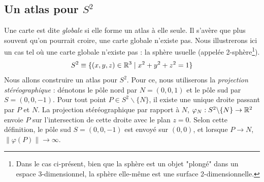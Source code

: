\subsection{Un atlas pour $S^2$}
Une carte est dite \emph{globale} si elle forme un atlas à elle seule. Il s'avère que plus souvent qu'on pourrait croire, une carte globale n'existe pas. Nous illustrerons ici un cas tel où une carte globale n'existe pas : la sphère usuelle (appelée 2-sphère\footnote{Dans le cas ci-présent, bien que la sphère est un objet "plongé" dans un espace 3-dimensionnel, la sphère elle-même est une surface 2-dimensionnelle.}).
\begin{equation}
    S^2 \equiv \{ (x,y,z) \in \mathbb{R}^3 \mid x^2+y^2+z^2 = 1\}
\end{equation}
Nous allons construire un atlas pour $S^2$. Pour ce, nous utiliserons la \emph{projection stéréographique} : dénotons le pôle nord par $N = (0,0,1)$ et le pôle sud par $S = (0,0,-1)$. Pour tout point $P\in S^2\backslash \{N\}$, il existe une unique droite passant par $P$ et $N$. La projection stéréographique par rapport à $N$, $\varphi_N:S^2\backslash\{N\} \to \mathbb{R}^2$ envoie $P$ sur l'intersection de cette droite avec le plan $z=0$. Selon cette définition, le pôle sud $S = (0,0,-1)$ est envoyé sur $(0,0)$, et lorsque $P \to N$, $\lVert \varphi(P) \lVert \to \infty$.

